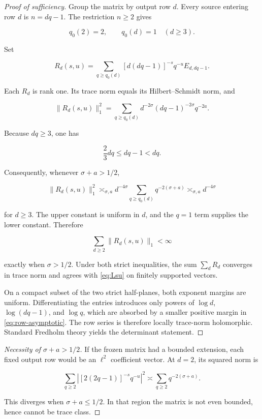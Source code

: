 \begin{proof}[Proof of sufficiency]
Group the matrix by output row \(d\).  Every source entering row \(d\) is
\(n=dq-1\).  The restriction \(n\ge2\) gives

\[
 q_0(2)=2,
 \qquad q_0(d)=1\quad(d\ge3).
\]

Set

\begin{equation}
 R_d(s,u)=
 \sum_{q\ge q_0(d)}[d(dq-1)]^{-s}q^{-u}E_{d,dq-1}.
\label{eq:row-block}
\end{equation}

Each \(R_d\) is rank one.  Its trace norm equals its Hilbert--Schmidt norm,
and

\begin{equation}
 \|R_d(s,u)\|_1^2=
 \sum_{q\ge q_0(d)}
 d^{-2\sigma}(dq-1)^{-2\sigma}q^{-2a}.
\label{eq:row-norm}
\end{equation}

Because \(dq\ge3\), one has

\[
 \frac23dq\le dq-1<dq.
\]

Consequently, whenever \(\sigma+a>1/2\),

\begin{equation}
 \|R_d(s,u)\|_1^2
 \asymp_{\sigma,a}
 d^{-4\sigma}
 \sum_{q\ge q_0(d)}q^{-2(\sigma+a)}
 \asymp_{\sigma,a}d^{-4\sigma}
\label{eq:row-asymptotic}
\end{equation}

for \(d\ge3\).  The upper constant is uniform in \(d\), and the \(q=1\)
term supplies the lower constant.  Therefore

\[
 \sum_{d\ge2}\|R_d(s,u)\|_1<\infty
\]

exactly when \(\sigma>1/2\).  Under both strict inequalities, the sum
\(\sum_dR_d\) converges in trace norm and agrees with \cref{eq:Lsu} on
finitely supported vectors.

On a compact subset of the two strict half-planes, both exponent margins are
uniform.  Differentiating the entries introduces only powers of
\(\log d\), \(\log(dq-1)\), and \(\log q\), which are absorbed by a smaller
positive margin in \cref{eq:row-asymptotic}.  The row series is therefore
locally trace-norm holomorphic.  Standard Fredholm theory
\citep{Simon1977} yields the determinant statement.
\end{proof}

\begin{proof}[Necessity of \(\sigma+a>1/2\)]
If the frozen matrix had a bounded extension, each fixed output row would be
an \(\ell^2\) coefficient vector.  At \(d=2\), its squared norm is

\[
 \sum_{q\ge2}|[2(2q-1)]^{-s}q^{-u}|^2
 \asymp
 \sum_{q\ge2}q^{-2(\sigma+a)}.
\]

This diverges when \(\sigma+a\le1/2\).  In that region the matrix is not
even bounded, hence cannot be trace class.
\end{proof}

